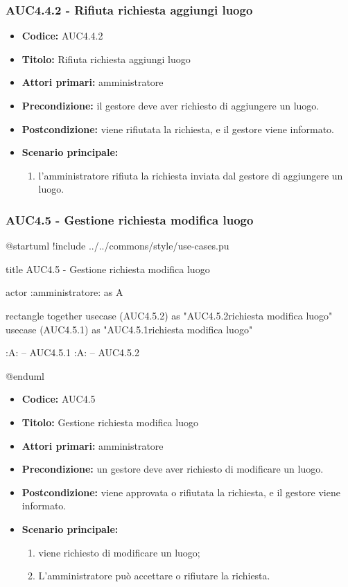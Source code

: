 \documentclass[casi-duso]{subfiles}
\begin{document}
\subsubsection{AUC4.4.2 - Rifiuta richiesta aggiungi luogo}%
\label{subsub:AUC4.4.2}
\begin{itemize}
  \item \textbf{Codice:} AUC4.4.2
  \item \textbf{Titolo:} Rifiuta richiesta aggiungi luogo
  \item \textbf{Attori primari:} amministratore
  \item \textbf{Precondizione:} il gestore deve aver richiesto di aggiungere un luogo.
  \item \textbf{Postcondizione:} viene rifiutata la richiesta, e il gestore viene informato.
  \item \textbf{Scenario principale:}
  \begin{enumerate}
    \item l'amministratore rifiuta la richiesta inviata dal gestore di aggiungere un luogo.
  \end{enumerate}
\end{itemize}

\subsubsection{AUC4.5 - Gestione richiesta modifica luogo}%
\label{subsub:AUC4.5}

\begin{plantuml}
@startuml
!include ../../commons/style/use-cases.pu

title AUC4.5 - Gestione richiesta modifica luogo

actor :amministratore: as A

rectangle {
  together {
    usecase (AUC4.5.2) as "AUC4.5.2\nRifiuta richiesta modifica luogo"
    usecase (AUC4.5.1) as "AUC4.5.1\nAccetta richiesta modifica luogo"
  }
}

:A: -- AUC4.5.1
:A: -- AUC4.5.2

@enduml
\end{plantuml}

\begin{itemize}
  \item \textbf{Codice:} AUC4.5
  \item \textbf{Titolo:} Gestione richiesta modifica luogo
  \item \textbf{Attori primari:} amministratore
  \item \textbf{Precondizione:} un gestore deve aver richiesto di modificare un luogo.
  \item \textbf{Postcondizione:} viene approvata o rifiutata la richiesta, e il gestore viene informato.
  \item \textbf{Scenario principale:}
  \begin{enumerate}
    \item viene richiesto di modificare un luogo;
    \item L'amministratore può accettare o rifiutare la richiesta.
  \end{enumerate}
\end{itemize}
\end{document}
